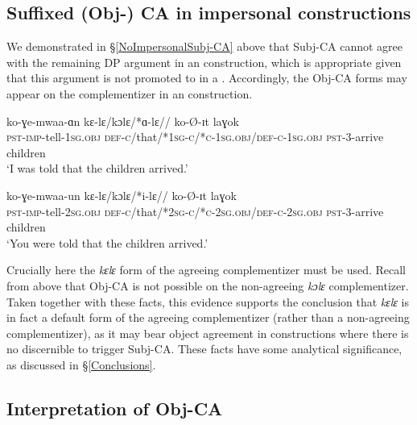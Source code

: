 \documentclass[output=paper,newtxmath,modfonts,nonflat,hidelinks]{langsci/langscibook}
\begin{document}
\subsection{Suffixed (Obj-) CA in impersonal constructions}
We demonstrated in \S \ref{NoImpersonalSubj-CA} above that Subj-CA cannot agree with the remaining DP argument in an  construction, which is appropriate given that this argument is not promoted to  in a  . Accordingly, the Obj-CA forms may appear on the complementizer in an  construction. 

\ea
\begin{xlist}

\ex
\gll ko-ɣe-mwaa-ɑn kɛ-lɛ/kɔlɛ/*ɑ-lɛ// ko-\O-ɪt laɣok  \\
\textsc{pst}-\textsc{imp}-tell-1\textsc{sg}.\textsc{obj} \textsc{def}-\textsc{c}/that/*1\textsc{sg-c/*c-}1\textsc{sg}.\textsc{obj}/\textsc{def}-\textsc{c}-1\textsc{sg}.\textsc{obj} \textsc{pst}-3-arrive children \\
\glt `I was told that the children arrived.' 

\ex
\gll ko-ɣe-mwaa-un kɛ-lɛ/kɔlɛ/*i-lɛ// ko-\O-ɪt laɣok \\
\textsc{pst}-\textsc{imp}-tell-2\textsc{sg}.\textsc{obj} \textsc{def}-\textsc{c}/that/*2\textsc{sg-c/*c-}2\textsc{sg}.\textsc{obj}/\textsc{def}-\textsc{c}-2\textsc{sg}.\textsc{obj} \textsc{pst}-3-arrive children\\
\glt `You were told that the children arrived.' 

\end{xlist}
\z

\noindent Crucially here the \textit{kɛlɛ} form of the agreeing complementizer must be used. Recall from above that Obj-CA is not possible on the non-agreeing \textit{kɔlɛ} complementizer. Taken together with these facts, this evidence  supports the conclusion that \textit{kɛlɛ} is in fact a default form of the agreeing complementizer (rather than a non-agreeing complementizer), as it may bear object agreement in  constructions where there is no discernible  to trigger Subj-CA. These facts have some analytical significance, as discussed in \S \ref{Conclusions}.

\subsection{Interpretation of Obj-CA} \label{Obj-CA Interpretation}
\end{document}
